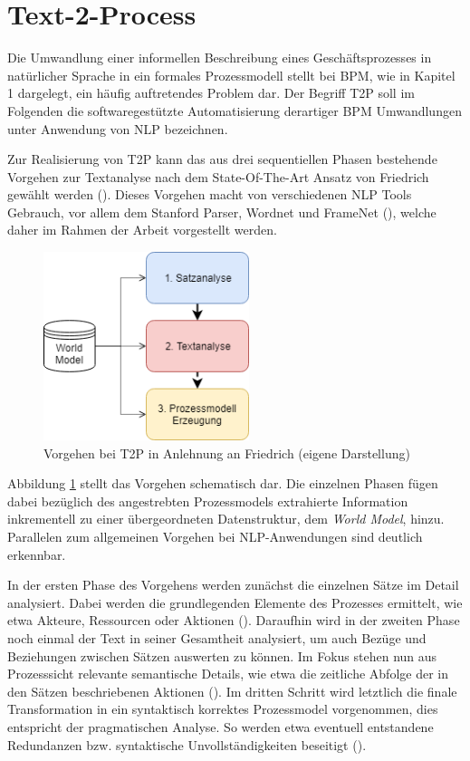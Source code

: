 \section{Text-2-Process}


Die Umwandlung einer informellen Beschreibung eines Geschäftsprozesses in na\-tür\-li\-cher Sprache in ein formales Prozessmodell stellt bei \ac{BPM}, wie in Kapitel 1 dargelegt, ein häufig auftretendes Problem dar. 
Der Begriff \ac{T2P} soll im Folgenden die softwaregestützte Automatisierung derartiger \ac{BPM} Umwandlungen unter Anwendung von \ac{NLP} bezeichnen.\par
Zur Realisierung von \ac{T2P} kann das aus drei sequentiellen Phasen bestehende Vorgehen zur Textanalyse nach dem State-Of-The-Art Ansatz von Friedrich gewählt werden (\cite[vgl.][4 ff.]{FRIEDRICH2}). Dieses Vorgehen macht von verschiedenen \ac{NLP} Tools Gebrauch, vor allem dem Stanford Parser, Wordnet und FrameNet (\cite[vgl.][11]{RIEFER}), welche daher im Rahmen der Arbeit vorgestellt werden.
\begin{figure}
\includegraphics[width=6cm]{pictures/T2P_highlevel.png}
\caption{Vorgehen bei T2P in Anlehnung an Friedrich (eigene Darstellung)}
\label{fig:T2PHL}
\end{figure}
Abbildung \ref{fig:T2PHL} stellt das Vorgehen schematisch dar. Die einzelnen Phasen fügen dabei bezüglich des angestrebten Prozessmodels extrahierte Information inkrementell zu einer übergeordneten Datenstruktur, dem \textit{World Model}, hinzu. Parallelen zum allgemeinen Vorgehen bei NLP-Anwendungen sind deutlich erkennbar.\par
In der ersten Phase des Vorgehens werden zunächst die einzelnen Sätze im Detail analysiert. Dabei werden die grundlegenden Elemente des Prozesses ermittelt, wie etwa Akteure, Ressourcen oder Aktionen (\cite[vgl.][47 ff.]{FRIEDRICH1}). Daraufhin wird in der zweiten Phase noch einmal der Text in seiner Gesamtheit analysiert, um auch Bezüge und Beziehungen zwischen Sätzen auswerten zu können. Im Fokus stehen nun aus Prozesssicht relevante semantische Details, wie etwa die zeitliche Abfolge der in den Sätzen beschriebenen Aktionen (\cite[vgl.][66 ff.]{FRIEDRICH1}). Im dritten Schritt wird letztlich die finale Transformation in ein syntaktisch korrektes Prozessmodel vorgenommen, dies entspricht der pragmatischen Analyse. So werden etwa  eventuell entstandene Redundanzen bzw. syntaktische Unvollständigkeiten beseitigt (\cite[vgl.][90 ff.]{FRIEDRICH1}).
